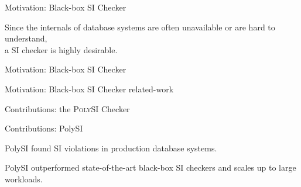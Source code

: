 \begin{frame}{Motivation: Black-box SI Checker}
  \begin{center}
    Since the internals of database systems are often unavailable
    or are hard to understand, \\[6pt]
    a  SI checker is highly desirable.
  \end{center}
\end{frame}

\begin{frame}{Motivation: Black-box SI Checker}
  \begin{center}
    

    \vspace{0.30cm}
  \end{center}
\end{frame}

\begin{frame}{Motivation: Black-box SI Checker}
  related-work
\end{frame}

\begin{frame}{Contributions: the \textsc{PolySI} Checker}
  \begin{center}
    

    \vspace{0.50cm}
  \end{center}
\end{frame}

\begin{frame}{Contributions: PolySI}
  \begin{center}
    PolySI found SI violations in production database systems.

    \vspace{0.80cm}
    PolySI outperformed state-of-the-art black-box SI checkers
    and scales up to large workloads.
  \end{center}
\end{frame}
